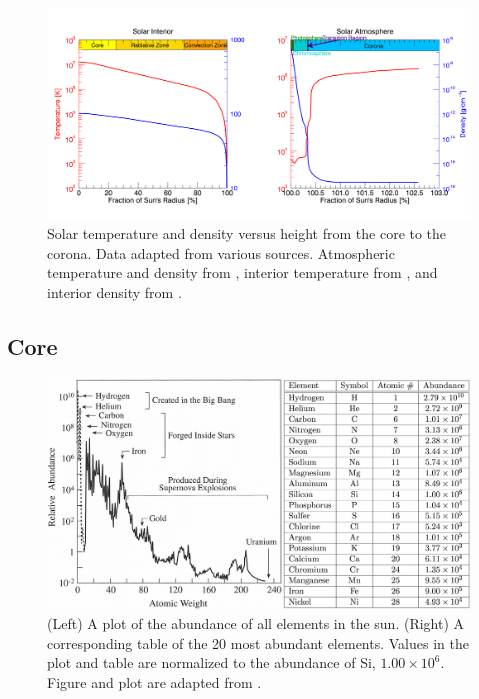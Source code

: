 \begin{figure}[!h]
    \begin{center}
	    \includegraphics[width=\textwidth]{Images/SolarTemperatureAndDensity.png}
    \end{center}
    \caption[Solar Temperature and Density Versus Height]{
        Solar temperature and density versus height from the core to the corona. Data adapted
        from various sources. Atmospheric temperature and density from \citet{Eddy1979}, 
        interior temperature from \citet{Lang2001}, and interior density from  
        \citet{Christensen-Dalsgaard1996}.         
    }
    \label{fig:suntemperaturedensity}
\end{figure}

\subsection{Core}

\begin{figure}[!h]
    \begin{center}
	    \includegraphics[width=\textwidth]{Images/SolarAbundance.png}
    \end{center}
    \caption[Solar Elemental Abundances]{
        (Left) A plot of the abundance of all elements in the sun. (Right) A corresponding table of the 20 most 
        abundant elements. Values in the plot and table are normalized to the abundance of Si, $1.00 \times 10^6$. 
        Figure and plot are adapted from \citet{Lang2001}.       
    }
    \label{fig:sunabundance}
\end{figure}

